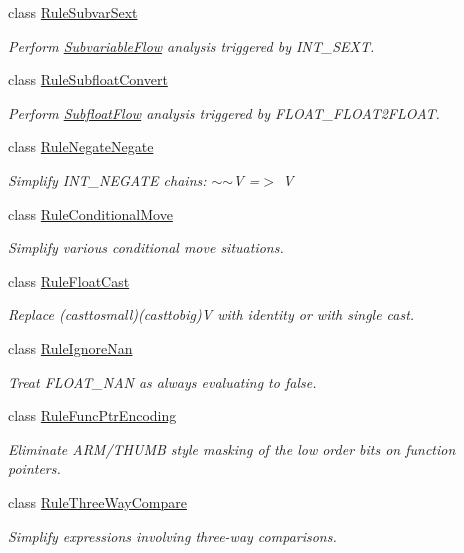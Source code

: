 \begin{DoxyCompactItemize}
class \mbox{\hyperlink{class_rule_subvar_sext}{Rule\+Subvar\+Sext}}
\begin{DoxyCompactList}\small\item\em Perform \mbox{\hyperlink{class_subvariable_flow}{Subvariable\+Flow}} analysis triggered by I\+N\+T\+\_\+\+S\+E\+XT. \end{DoxyCompactList}\item 
class \mbox{\hyperlink{class_rule_subfloat_convert}{Rule\+Subfloat\+Convert}}
\begin{DoxyCompactList}\small\item\em Perform \mbox{\hyperlink{class_subfloat_flow}{Subfloat\+Flow}} analysis triggered by F\+L\+O\+A\+T\+\_\+\+F\+L\+O\+A\+T2\+F\+L\+O\+AT. \end{DoxyCompactList}\item 
class \mbox{\hyperlink{class_rule_negate_negate}{Rule\+Negate\+Negate}}
\begin{DoxyCompactList}\small\item\em Simplify I\+N\+T\+\_\+\+N\+E\+G\+A\+TE chains\+: {\ttfamily $\sim$$\sim$V =$>$ V} \end{DoxyCompactList}\item 
class \mbox{\hyperlink{class_rule_conditional_move}{Rule\+Conditional\+Move}}
\begin{DoxyCompactList}\small\item\em Simplify various conditional move situations. \end{DoxyCompactList}\item 
class \mbox{\hyperlink{class_rule_float_cast}{Rule\+Float\+Cast}}
\begin{DoxyCompactList}\small\item\em Replace (casttosmall)(casttobig)V with identity or with single cast. \end{DoxyCompactList}\item 
class \mbox{\hyperlink{class_rule_ignore_nan}{Rule\+Ignore\+Nan}}
\begin{DoxyCompactList}\small\item\em Treat F\+L\+O\+A\+T\+\_\+\+N\+AN as always evaluating to false. \end{DoxyCompactList}\item 
class \mbox{\hyperlink{class_rule_func_ptr_encoding}{Rule\+Func\+Ptr\+Encoding}}
\begin{DoxyCompactList}\small\item\em Eliminate A\+R\+M/\+T\+H\+U\+MB style masking of the low order bits on function pointers. \end{DoxyCompactList}\item 
class \mbox{\hyperlink{class_rule_three_way_compare}{Rule\+Three\+Way\+Compare}}
\begin{DoxyCompactList}\small\item\em Simplify expressions involving {\itshape three-\/way} comparisons. \end{DoxyCompactList}\end{DoxyCompactItemize}


